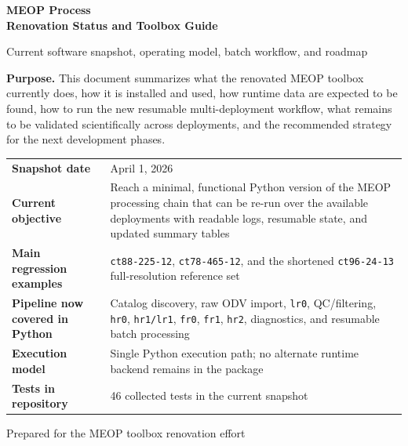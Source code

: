 \documentclass[11pt,a4paper]{article}
\newcommand{\pkg}[1]{\texttt{#1}}
\begin{document}
\begin{titlepage}
  \centering
  \vspace*{1.7cm}
  {\Huge\bfseries\color{meopblue}MEOP Process\\[0.25em] Renovation Status and Toolbox Guide\par}
  \vspace{0.8cm}
  {\Large Current software snapshot, operating model, batch workflow, and roadmap\par}
  \vspace{1.2cm}

  \noindent\colorbox{meoplight}{%
    \parbox{0.93\textwidth}{
      \vspace{0.35cm}
      \textbf{Purpose.} This document summarizes what the renovated MEOP toolbox currently does, how it is installed and used, how runtime data are expected to be found, how to run the new resumable multi-deployment workflow, what remains to be validated scientifically across deployments, and the recommended strategy for the next development phases.
      \vspace{0.35cm}
    }
  }

  \vspace{1.2cm}

  \begin{tabularx}{0.93\textwidth}{>{\bfseries}p{}X}
    Snapshot date & April 1, 2026 \\
    Current objective & Reach a minimal, functional Python version of the MEOP processing chain that can be re-run over the available deployments with readable logs, resumable state, and updated summary tables \\
    Main regression examples & \pkg{ct88-225-12}, \pkg{ct78-465-12}, and the shortened \pkg{ct96-24-13} full-resolution reference set \\
    Pipeline now covered in Python & Catalog discovery, raw ODV import, \pkg{lr0}, QC/filtering, \pkg{hr0}, \pkg{hr1/lr1}, \pkg{fr0}, \pkg{fr1}, \pkg{hr2}, diagnostics, and resumable batch processing \\
    Execution model & Single Python execution path; no alternate runtime backend remains in the package \\
    Tests in repository & 46 collected tests in the current snapshot \\
  \end{tabularx}

  \vfill
  {\large Prepared for the MEOP toolbox renovation effort\par}
\end{titlepage}
\end{document}
